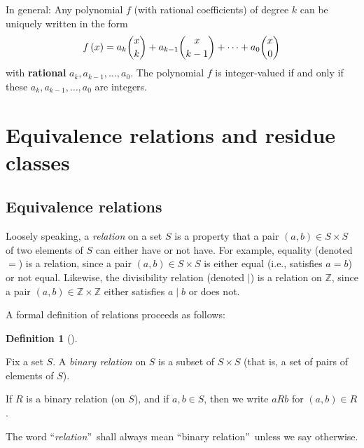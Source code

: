 \documentclass[numbers=enddot,12pt,final,onecolumn,notitlepage]{scrartcl}%
\numberwithin{exer}{subsection}
\theoremstyle{definition}
\newtheorem{defi}[theo]{Definition}
\newenvironment{definition}[1][]
{\begin{defi}[#1]\begin{leftbar}}
{\end{leftbar}\end{defi}}
\begin{document}
In general: Any polynomial $f$ (with rational coefficients) of degree $k$ can
be uniquely written in the form%
\[
f\left(  x\right)  =a_{k}\dbinom{x}{k}+a_{k-1}\dbinom{x}{k-1}+\cdots
+a_{0}\dbinom{x}{0}%
\]
with \textbf{rational} $a_{k},a_{k-1},\ldots,a_{0}$. The polynomial $f$ is
integer-valued if and only if these $a_{k},a_{k-1},\ldots,a_{0}$ are integers.

\section{Equivalence relations and residue classes}

\subsection{Equivalence relations}

Loosely speaking, a \textit{relation} on a set $S$ is a property that a pair
$\left(  a,b\right)  \in S\times S$ of two elements of $S$ can either have or
not have. For example, equality (denoted $=$) is a relation, since a pair
$\left(  a,b\right)  \in S\times S$ is either equal (i.e., satisfies $a=b$) or
not equal. Likewise, the divisibility relation (denoted $\mid$) is a relation
on $\mathbb{Z}$, since a pair $\left(  a,b\right)  \in\mathbb{Z}%
\times\mathbb{Z}$ either satisfies $a\mid b$ or does not.

A formal definition of relations proceeds as follows:

\begin{definition}
Fix a set $S$. A \textit{binary relation} on $S$ is a subset of $S\times S$
(that is, a set of pairs of elements of $S$).

If $R$ is a binary relation (on $S$), and if $a,b\in S$, then we write $aRb$
for $\left(  a,b\right)  \in R$.

The word \textquotedblleft\textit{relation}\textquotedblright\ shall always
mean \textquotedblleft binary relation\textquotedblright\ unless we say otherwise.
\end{definition}
\end{document}
